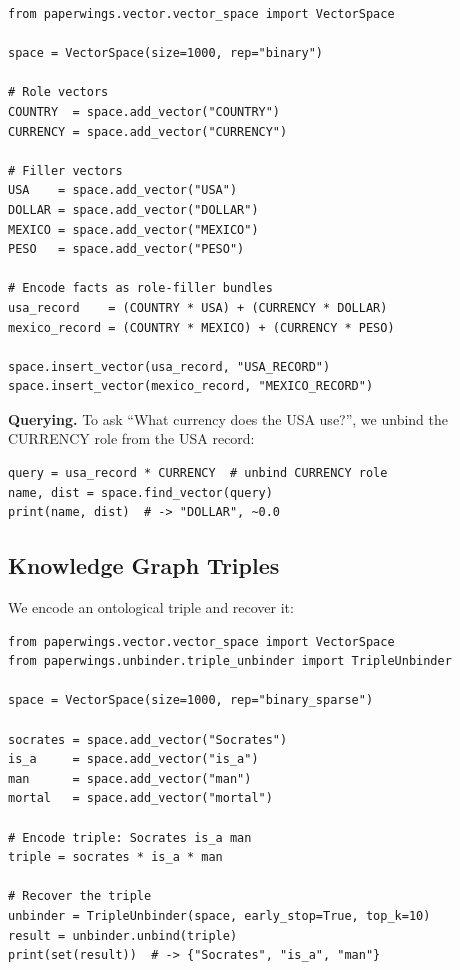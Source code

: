 \documentclass[11pt]{article}
\begin{document}
\begin{lstlisting}[caption={Encoding semantic facts with role--filler binding.}]
from paperwings.vector.vector_space import VectorSpace

space = VectorSpace(size=1000, rep="binary")

# Role vectors
COUNTRY  = space.add_vector("COUNTRY")
CURRENCY = space.add_vector("CURRENCY")

# Filler vectors
USA    = space.add_vector("USA")
DOLLAR = space.add_vector("DOLLAR")
MEXICO = space.add_vector("MEXICO")
PESO   = space.add_vector("PESO")

# Encode facts as role-filler bundles
usa_record    = (COUNTRY * USA) + (CURRENCY * DOLLAR)
mexico_record = (COUNTRY * MEXICO) + (CURRENCY * PESO)

space.insert_vector(usa_record, "USA_RECORD")
space.insert_vector(mexico_record, "MEXICO_RECORD")
\end{lstlisting}

\noindent\textbf{Querying.} To ask ``What currency does the USA use?'', we unbind the CURRENCY role from the USA record:

\begin{lstlisting}[caption={Querying by unbinding.}]
query = usa_record * CURRENCY  # unbind CURRENCY role
name, dist = space.find_vector(query)
print(name, dist)  # -> "DOLLAR", ~0.0
\end{lstlisting}

\subsection{Knowledge Graph Triples}

We encode an ontological triple and recover it:

\begin{lstlisting}[caption={Triple encoding and recovery.}]
from paperwings.vector.vector_space import VectorSpace
from paperwings.unbinder.triple_unbinder import TripleUnbinder

space = VectorSpace(size=1000, rep="binary_sparse")

socrates = space.add_vector("Socrates")
is_a     = space.add_vector("is_a")
man      = space.add_vector("man")
mortal   = space.add_vector("mortal")

# Encode triple: Socrates is_a man
triple = socrates * is_a * man

# Recover the triple
unbinder = TripleUnbinder(space, early_stop=True, top_k=10)
result = unbinder.unbind(triple)
print(set(result))  # -> {"Socrates", "is_a", "man"}
\end{lstlisting}
\end{document}
